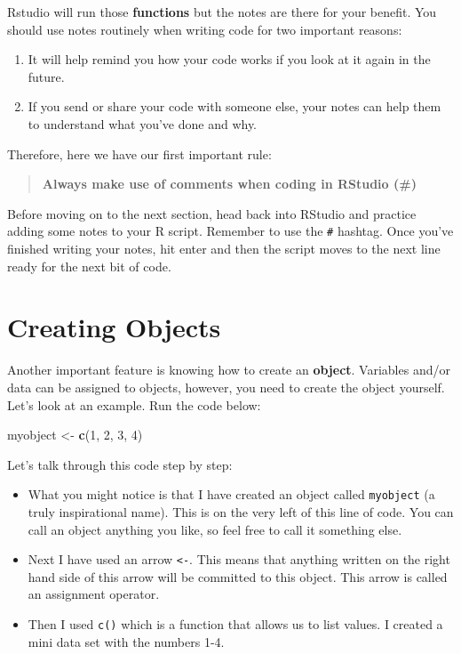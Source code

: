 \documentclass[
]{book}
\newenvironment{Shaded}{\begin{snugshade}}{\end{snugshade}}
\newcommand{\DecValTok}[1]{\textcolor[rgb]{0.00,0.00,0.81}{#1}}
\newcommand{\FunctionTok}[1]{\textcolor[rgb]{0.13,0.29,0.53}{\textbf{#1}}}
\newcommand{\NormalTok}[1]{#1}
\newcommand{\OtherTok}[1]{\textcolor[rgb]{0.56,0.35,0.01}{#1}}
\let\oldsection\section
\renewcommand{\section}{\needspace{5\baselineskip}\oldsection}
\begin{document}
Rstudio will run those \textbf{functions} but the notes are there for your benefit. You should use notes routinely when writing code for two important reasons:

\begin{enumerate}
\def\labelenumi{\arabic{enumi}.}
\item
  It will help remind you how your code works if you look at it again in the future.
\item
  If you send or share your code with someone else, your notes can help them to understand what you've done and why.
\end{enumerate}

Therefore, here we have our first important rule:

\begin{quote}
\textbf{Always make use of comments when coding in RStudio (\#)}
\end{quote}

Before moving on to the next section, head back into RStudio and practice adding some notes to your R script. Remember to use the \texttt{\#} hashtag. Once you've finished writing your notes, hit enter and then the script moves to the next line ready for the next bit of code.

\section{Creating Objects}\label{creating-objects}

Another important feature is knowing how to create an \textbf{object}. Variables and/or data can be assigned to objects, however, you need to create the object yourself. Let's look at an example. Run the code below:

\begin{Shaded}
\begin{Highlighting}[]
\NormalTok{myobject }\OtherTok{\textless{}{-}} \FunctionTok{c}\NormalTok{(}\DecValTok{1}\NormalTok{, }\DecValTok{2}\NormalTok{, }\DecValTok{3}\NormalTok{, }\DecValTok{4}\NormalTok{)}
\end{Highlighting}
\end{Shaded}

Let's talk through this code step by step:

\begin{itemize}
\item
  What you might notice is that I have created an object called \texttt{myobject} (a truly inspirational name). This is on the very left of this line of code. You can call an object anything you like, so feel free to call it something else.
\item
  Next I have used an arrow \texttt{\textless{}-}. This means that anything written on the right hand side of this arrow will be committed to this object. This arrow is called an assignment operator.
\item
  Then I used \texttt{c()} which is a function that allows us to list values. I created a mini data set with the numbers 1-4.
\end{itemize}
\end{document}

